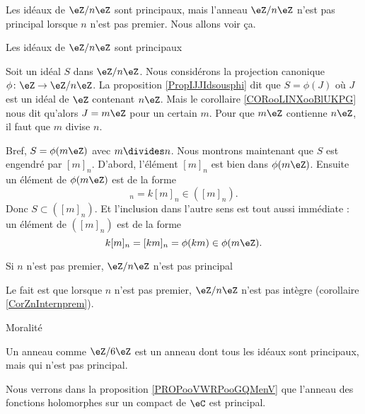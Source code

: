 \begin{example}       \label{EXooCJRPooYkWdyr}

    Les idéaux de \( \eZ/n\eZ\) sont principaux, mais l'anneau \( \eZ/n\eZ\) n'est pas principal lorsque \( n\) n'est pas premier. Nous allons voir ça.

    \begin{subproof}
        \item[Les idéaux de \( \eZ/n\eZ\) sont principaux]

            Soit un idéal \( S\) dans \( \eZ/n\eZ\). Nous considérons la projection canonique \( \phi\colon \eZ\to \eZ/n\eZ\). La proposition \ref{PropIJJIdsousphi} dit que  \( S=\phi(J)\) où \( J\) est un idéal de \( \eZ\) contenant \( n\eZ\). Mais le corollaire \ref{CORooLINXooBlUKPG} nous dit qu'alors \( J=m\eZ\) pour un certain \( m\). Pour que \( m\eZ\) contienne \( n\eZ\), il faut que \( m\) divise \( n\).

            Bref, \( S=\phi(m\eZ)\) avec \( m\divides n\). Nous montrons maintenant que \( S\) est engendré par \( [m]_n\). D'abord, l'élément \( [m]_n\) est bien dans \( \phi(m\eZ)\). Ensuite un élément de \( \phi(m\eZ)\) est de la forme 
            \begin{equation}
                [km]_n=k[m]_n\in ([m]_n).
            \end{equation}
            Donc \( S\subset ([m]_n)\). Et l'inclusion dans l'autre sens est tout aussi immédiate : un élément de \( ([m]_n)\) est de la forme
            \begin{equation}
                k[m]_n=[km]_n=\phi(km)\in \phi(m\eZ).
            \end{equation}

        \item[Si \( n\) n'est pas premier, \( \eZ/n\eZ\) n'est pas principal]
            
            Le fait est que lorsque \( n\) n'est pas premier, \( \eZ/n\eZ\) n'est pas intègre (corollaire \ref{CorZnInternprem}).

        \item[Moralité]

            Un anneau comme \( \eZ/6\eZ\) est un anneau dont tous les idéaux sont principaux, mais qui n'est pas principal.
    
    \end{subproof}
\end{example}

\begin{example}
    Nous verrons dans la proposition \ref{PROPooVWRPooGQMenV} que l'anneau des fonctions holomorphes sur un compact de \( \eC\) est principal.
\end{example}

